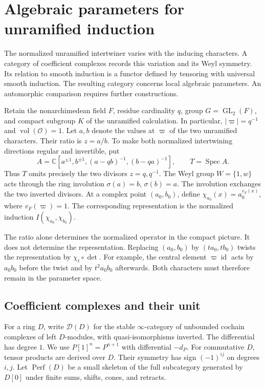 \section{Algebraic parameters for unramified induction}

The normalized unramified intertwiner varies with the inducing characters.
A category of coefficient complexes records this variation and its Weyl symmetry.
Its relation to smooth induction is a functor defined by tensoring
with universal smooth induction.
The resulting category concerns local algebraic parameters.
An automorphic comparison requires further constructions.

Retain the nonarchimedean field $F$, residue cardinality $q$, group
$G=\operatorname{GL}_2(F)$, and compact subgroup $K$ of the unramified calculation.
In particular, $|\varpi|=q^{-1}$ and $\operatorname{vol}(\mathcal O)=1$.
Let $a,b$ denote the values at $\varpi$ of the two unramified characters.
Their ratio is $z=a/b$.
To make both normalized intertwining directions regular and invertible, put
\[
 A=\mathbb C[a^{\pm1},b^{\pm1},(a-qb)^{-1},(b-qa)^{-1}],
 \qquad T=\operatorname{Spec}A.
\]
Thus $T$ omits precisely the two divisors $z=q,q^{-1}$.
The Weyl group $W=\{1,w\}$ acts through the ring involution
$\sigma(a)=b$, $\sigma(b)=a$.
The involution exchanges the two inverted divisors.
At a complex point $(a_0,b_0)$, define
$\chi_{a_0}(x)=a_0^{v_F(x)}$, where $v_F(\varpi)=1$.
The corresponding representation is the normalized induction
$I(\chi_{a_0},\chi_{b_0})$.

The ratio alone determines the normalized operator in the compact picture.
It does not determine the representation.
Replacing $(a_0,b_0)$ by $(ta_0,tb_0)$ twists the representation by
$\chi_t\circ\det$.
For example, the central element $\varpi\operatorname{id}$ acts by
$a_0b_0$ before the twist and by $t^2a_0b_0$ afterwards.
Both characters must therefore remain in the parameter space.

\subsection{Coefficient complexes and their unit}

For a ring $D$, write $\mathcal D(D)$ for the stable $\infty$-category
of unbounded cochain complexes of left $D$-modules, with quasi-isomorphisms inverted.
The differential has degree $1$.
We use $P[1]^n=P^{n+1}$ with differential $-d_P$.
For commutative $D$, tensor products are derived over $D$.
Their symmetry has sign $(-1)^{ij}$ on degrees $i,j$.
Let $\operatorname{Perf}(D)$ be a small skeleton of the full subcategory
generated by $D[0]$ under finite sums, shifts, cones, and retracts.

